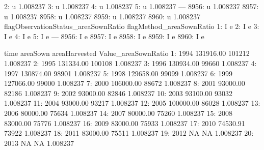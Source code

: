 \documentclass[nojss]{jss}
\begin{document}
\begin{Schunk}
\begin{Soutput}
   2:                               u            1.008237
   3:                               u            1.008237
   4:                               u            1.008237
   5:                               u            1.008237
  ---                                                    
8956:                               u            1.008237
8957:                               u            1.008237
8958:                               u            1.008237
8959:                               u            1.008237
8960:                               u            1.008237
      flagObservationStatus_areaSownRatio flagMethod_areaSownRatio
   1:                                   I                        e
   2:                                   I                        e
   3:                                   I                        e
   4:                                   I                        e
   5:                                   I                        e
  ---                                                             
8956:                                   I                        e
8957:                                   I                        e
8958:                                   I                        e
8959:                                   I                        e
8960:                                   I                        e
\end{Soutput}
\begin{Soutput}
    time  areaSown areaHarvested Value_areaSownRatio
 1: 1994 131916.00        101212            1.008237
 2: 1995 131334.00        100108            1.008237
 3: 1996 130934.00         99660            1.008237
 4: 1997 130874.00         98901            1.008237
 5: 1998 129658.00         99099            1.008237
 6: 1999 127066.00         99000            1.008237
 7: 2000 106000.00         88672            1.008237
 8: 2001  93000.00         82186            1.008237
 9: 2002  93000.00         82846            1.008237
10: 2003  93100.00         93032            1.008237
11: 2004  93000.00         93217            1.008237
12: 2005 100000.00         86028            1.008237
13: 2006  80000.00         75634            1.008237
14: 2007  80000.00         75260            1.008237
15: 2008  83000.00         75776            1.008237
16: 2009  83000.00         75933            1.008237
17: 2010  74530.91         73922            1.008237
18: 2011  83000.00         75511            1.008237
19: 2012        NA            NA            1.008237
20: 2013        NA            NA            1.008237
\end{Soutput}
\end{Schunk}
\end{document}
